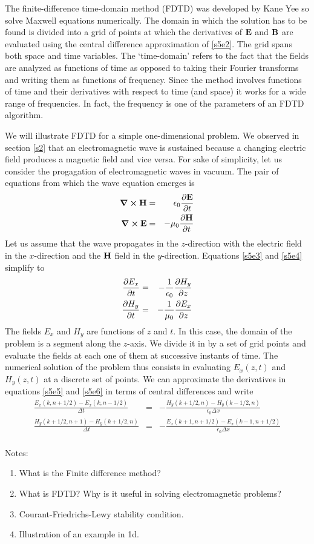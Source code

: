 \documentclass[11pt]{article}
\numberwithin{equation}{section}
\begin{document}
The finite-difference time-domain method (FDTD) was developed by Kane Yee
\cite{yee1966numerical} so solve Maxwell equations numerically. The domain
in which the solution has to be found is divided into a grid of points at
which the derivatives of $\vb{E}$ and $\vb{B}$ are evaluated using the
central difference approximation of \eqref{s5e2}. The grid spans both space
and time variables. The `time-domain' refers to the fact that the fields are
analyzed as functions of time as opposed to taking their Fourier transforms
and writing them as functions of frequency. Since the method involves
functions of time and their derivatives with respect to time (and space)
it works for a wide range of frequencies. In fact, the frequency is one of
the parameters of an FDTD algorithm.

We will illustrate FDTD for a simple one-dimensional problem. We observed
in section \ref{s2} that an electromagnetic wave is sustained because a 
changing electric field produces a magnetic field and vice versa. For sake
of simplicity, let us consider the progagation of electromagnetic waves in
vacuum. The pair of equations from which the wave equation emerges is
\begin{eqnarray}
\curl\vb{H} &=& \epsilon_0\pdv{\vb{E}}{t} \label{s5e3} \\
\curl\vb{E} &=& -\mu_0\pdv{\vb{H}}{t} \label{s5e4}
\end{eqnarray}
Let us assume that the wave propagates in the $z$-direction with the 
electric field in the $x$-direction and the $\vb{H}$ field in the
$y$-direction. Equations \eqref{s5e3} and \eqref{s5e4} simplify to
\begin{eqnarray}
\pdv{E_x}{t} &=& -\frac{1}{\epsilon_0}\pdv{H_y}{z} \label{s5e5} \\
\pdv{H_y}{t} &=& -\frac{1}{\mu_0}\pdv{E_x}{z} \label{s5e6}
\end{eqnarray}
The fields $E_x$ and $H_y$ are functions of $z$ and $t$. In this case, the
domain of the problem is a segment along the $z$-axis. We divide it in by a 
set of grid points and evaluate the fields at each one of them at successive
instants of time. The numerical solution of the problem thus consists in
evaluating $E_x(z, t)$ and $H_y(z, t)$ at a discrete set of points. We can
approximate the derivatives in equations \eqref{s5e5} and \eqref{s5e6} in
terms of central differences and write
\begin{eqnarray}
\frac{E_x(k, n + 1/2) - E_x(k, n - 1/2)}{\Delta t} 
 &=& -\frac{H_y(k + 1/2, n) - H_y(k - 1/2, n)}{\epsilon_0\Delta x}
\label{s5e7} \\
\frac{H_y(k + 1/2, n + 1) - H_y(k + 1/2, n)}{\Delta t} 
&=&
-\frac{E_x(k + 1, n + 1/2) - E_x(k - 1, n + 1/2)}{\epsilon_0\Delta x}
\nonumber \\
 & & \label{s5e8} 
\end{eqnarray}

Notes:
\begin{enumerate}
\item What is the Finite difference method?
\item What is FDTD? Why is it useful in solving electromagnetic problems?
\item Courant-Friedrichs-Lewy stability condition.
\item Illustration of an example in 1d.
\end{enumerate}



\end{document}
